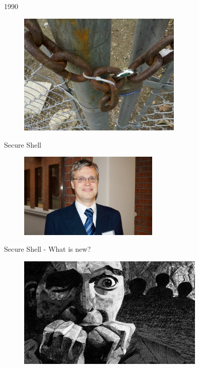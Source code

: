 \documentclass[10pt, compress, aspectratio=169]{beamer}
\begin{document}
\begin{frame}{1990}
  \begin{figure}[ht]
    \centering
    \includegraphics[width=0.7\textwidth, keepaspectratio=true]{images/secure_fail.jpg}
  \end{figure}
\end{frame}

\begin{frame}{Secure Shell}
  \begin{figure}[ht]
    \centering
    \includegraphics[width=0.6\textwidth, keepaspectratio=true]{images/TatuYlonen.jpg}
  \end{figure}
\end{frame}

\begin{frame}{Secure Shell - What is new?}
  \pause
  \begin{figure}[ht]
    \centering
    \includegraphics[width=0.8\textwidth, keepaspectratio=true]{images/paranoia.jpg}
  \end{figure}
\end{frame}
\end{document}
